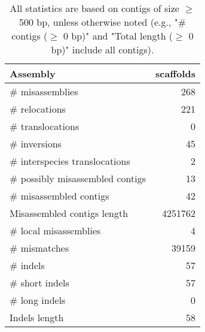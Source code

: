 \documentclass[12pt,a4paper]{article}
\begin{document}
\begin{table}[ht]
\begin{center}
\caption{All statistics are based on contigs of size $\geq$ 500 bp, unless otherwise noted (e.g., "\# contigs ($\geq$ 0 bp)" and "Total length ($\geq$ 0 bp)" include all contigs).}
\begin{tabular}{|l*{1}{|r}|}
\hline
Assembly & scaffolds \\ \hline
\# misassemblies & 268 \\ \hline
\hspace{5mm}\# relocations & 221 \\ \hline
\hspace{5mm}\# translocations & 0 \\ \hline
\hspace{5mm}\# inversions & 45 \\ \hline
\hspace{5mm}\# interspecies translocations & 2 \\ \hline
\# possibly misassembled contigs & 13 \\ \hline
\# misassembled contigs & 42 \\ \hline
Misassembled contigs length & 4251762 \\ \hline
\# local misassemblies & 4 \\ \hline
\# mismatches & 39159 \\ \hline
\# indels & 57 \\ \hline
\hspace{5mm}\# short indels & 57 \\ \hline
\hspace{5mm}\# long indels & 0 \\ \hline
Indels length & 58 \\ \hline
\end{tabular}
\end{center}
\end{table}
\end{document}
